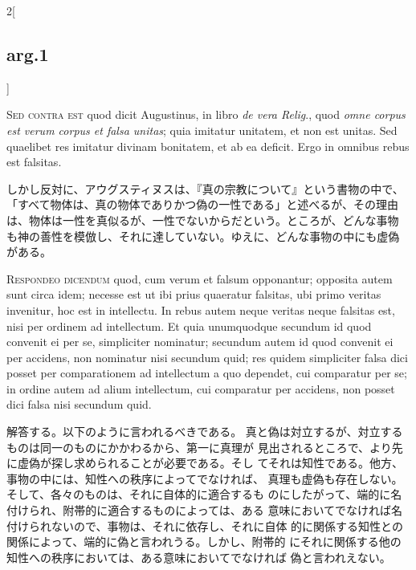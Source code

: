 \documentclass[paper=a4paper,fontsize=10pt,jafontsize=9pt,titlepage]{jlreq}
\begin{document}
\begin{paracol}{2}[\subsection{arg.1}]
\switchcolumn*[\subsection{s.c.}]


{\scshape Sed contra est} quod dicit Augustinus, in libro {\itshape de
vera Relig}., quod {\itshape omne corpus est verum corpus et falsa
unitas}; quia imitatur unitatem, et non est unitas. Sed quaelibet res
imitatur divinam bonitatem, et ab ea deficit. Ergo in omnibus rebus est
falsitas.

\switchcolumn

しかし反対に、アウグスティヌスは、『真の宗教について』という書物の中で、
 「すべて物体は、真の物体でありかつ偽の一性である」と述べるが、その理由
 は、物体は一性を真似るが、一性でないからだという。ところが、どんな事物
 も神の善性を模倣し、それに達していない。ゆえに、どんな事物の中にも虚偽
 がある。



{\scshape Respondeo dicendum} quod, cum verum et falsum
opponantur; opposita autem sunt circa idem; necesse est ut ibi prius
quaeratur falsitas, ubi primo veritas invenitur, hoc est in
intellectu. In rebus autem neque veritas neque falsitas est, nisi per
ordinem ad intellectum. Et quia unumquodque secundum id quod convenit ei
per se, simpliciter nominatur; secundum autem id quod convenit ei per
accidens, non nominatur nisi secundum quid; res quidem simpliciter falsa
dici posset per comparationem ad intellectum a quo dependet, cui
comparatur per se; in ordine autem ad alium intellectum, cui comparatur
per accidens, non posset dici falsa nisi secundum quid.

\switchcolumn

解答する。以下のように言われるべきである。
真と偽は対立するが、対立するものは同一のものにかかわるから、第一に真理が
 見出されるところで、より先に虚偽が探し求められることが必要である。そし
 てそれは知性である。他方、事物の中には、知性への秩序によってでなければ、
 真理も虚偽も存在しない。そして、各々のものは、それに自体的に適合するも
 のにしたがって、端的に名付けられ、附帯的に適合するものによっては、ある
 意味においてでなければ名付けられないので、事物は、それに依存し、それに自体
 的に関係する知性との関係によって、端的に偽と言われうる。しかし、附帯的
 にそれに関係する他の知性への秩序においては、ある意味においてでなければ
 偽と言われえない。


\end{paracol}
\end{document}
